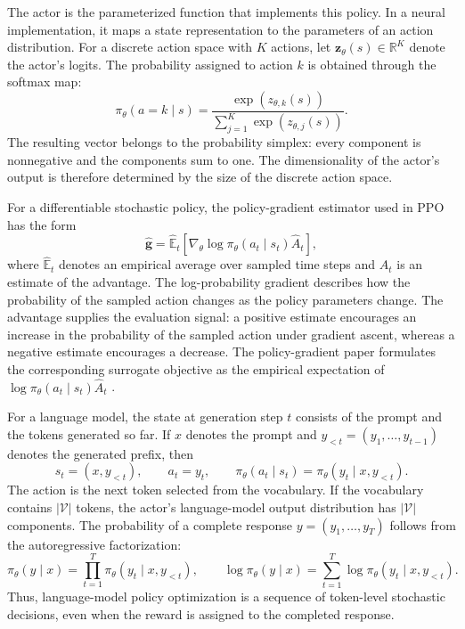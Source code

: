 The actor is the parameterized function that implements this policy. In a
neural implementation, it maps a state representation to the parameters of
an action distribution. For a discrete action space with \(K\) actions, let
\(\mathbf{z}_\theta(s)\in\mathbb{R}^{K}\) denote the actor's logits. The
probability assigned to action \(k\) is obtained through the softmax map:
\begin{equation}
    \pi_\theta(a=k\mid s)
    =
    \frac{\exp(z_{\theta,k}(s))}
    {\displaystyle\sum_{j=1}^{K}\exp(z_{\theta,j}(s))}.
    \label{eq:ac-softmax}
\end{equation}
The resulting vector belongs to the probability simplex: every component is
nonnegative and the components sum to one. The dimensionality of the actor's
output is therefore determined by the size of the discrete action space.

For a differentiable stochastic policy, the policy-gradient estimator used
in PPO has the form
\begin{equation}
    \widehat{\mathbf{g}}
    =
    \widehat{\mathbb{E}}_t
    \left[
        \nabla_\theta
        \log\pi_\theta(a_t\mid s_t)
        \widehat{A}_t
    \right],
    \label{eq:ac-policy-gradient}
\end{equation}
where \(\widehat{\mathbb{E}}_t\) denotes an empirical average over sampled
time steps and \(\widehat{A}_t\) is an estimate of the advantage. The
log-probability gradient describes how the probability of the sampled action
changes as the policy parameters change. The advantage supplies the
evaluation signal: a positive estimate encourages an increase in the
probability of the sampled action under gradient ascent, whereas a negative
estimate encourages a decrease. The policy-gradient paper formulates the
corresponding surrogate objective as the empirical expectation of
\(\log\pi_\theta(a_t\mid s_t)\widehat{A}_t\)
\parencite{schulman2017ppo}.

For a language model, the state at generation step \(t\) consists of the
prompt and the tokens generated so far. If \(x\) denotes the prompt and
\(y_{<t}=(y_1,\ldots,y_{t-1})\) denotes the generated prefix, then
\begin{equation}
    s_t=(x,y_{<t}),
    \qquad
    a_t=y_t,
    \qquad
    \pi_\theta(a_t\mid s_t)
    =
    \pi_\theta(y_t\mid x,y_{<t}).
    \label{eq:ac-llm-state-action}
\end{equation}
The action is the next token selected from the vocabulary. If the vocabulary
contains \(|\mathcal{V}|\) tokens, the actor's language-model output
distribution has \(|\mathcal{V}|\) components. The probability of a complete
response \(y=(y_1,\ldots,y_T)\) follows from the autoregressive
factorization:
\begin{equation}
    \pi_\theta(y\mid x)
    =
    \prod_{t=1}^{T}
    \pi_\theta(y_t\mid x,y_{<t}),
    \qquad
    \log\pi_\theta(y\mid x)
    =
    \sum_{t=1}^{T}
    \log\pi_\theta(y_t\mid x,y_{<t}).
    \label{eq:ac-autoregressive-factorization}
\end{equation}
Thus, language-model policy optimization is a sequence of token-level
stochastic decisions, even when the reward is assigned to the completed
response.

